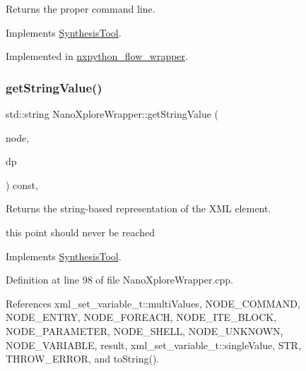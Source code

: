 Returns the proper command line. 



Implements \hyperlink{classSynthesisTool_a8eb2ef7a6230a997a2467d298613c045}{Synthesis\+Tool}.



Implemented in \hyperlink{classnxpython__flow__wrapper_ad88b053a2d5f727075d1e8dc2d574863}{nxpython\+\_\+flow\+\_\+wrapper}.

\mbox{\label{classNanoXploreWrapper_a88615cca1531c82e07e1ed0d4cc9a47e}} 
\subsubsection{\texorpdfstring{get\+String\+Value()}{getStringValue()}}
{\footnotesize\ttfamily std\+::string Nano\+Xplore\+Wrapper\+::get\+String\+Value (\begin{DoxyParamCaption}\item[{const \hyperlink{xml__script__command_8hpp_a1fe3d50ade66bc35e41be9b68bbbcd02}{xml\+\_\+script\+\_\+node\+\_\+t\+Ref}}]{node,  }\item[{const \hyperlink{DesignParameters_8hpp_ae36bb1c4c9150d0eeecfe1f96f42d157}{Design\+Parameters\+Ref} \&}]{dp }\end{DoxyParamCaption}) const\hspace{0.3cm}{\ttfamily [override]}, {\ttfamily [virtual]}}



Returns the string-\/based representation of the X\+ML element. 

this point should never be reached 

Implements \hyperlink{classSynthesisTool_a730699a51a36280c89b32f324dedc1a7}{Synthesis\+Tool}.



Definition at line 98 of file Nano\+Xplore\+Wrapper.\+cpp.



References xml\+\_\+set\+\_\+variable\+\_\+t\+::multi\+Values, N\+O\+D\+E\+\_\+\+C\+O\+M\+M\+A\+ND, N\+O\+D\+E\+\_\+\+E\+N\+T\+RY, N\+O\+D\+E\+\_\+\+F\+O\+R\+E\+A\+CH, N\+O\+D\+E\+\_\+\+I\+T\+E\+\_\+\+B\+L\+O\+CK, N\+O\+D\+E\+\_\+\+P\+A\+R\+A\+M\+E\+T\+ER, N\+O\+D\+E\+\_\+\+S\+H\+E\+LL, N\+O\+D\+E\+\_\+\+U\+N\+K\+N\+O\+WN, N\+O\+D\+E\+\_\+\+V\+A\+R\+I\+A\+B\+LE, result, xml\+\_\+set\+\_\+variable\+\_\+t\+::single\+Value, S\+TR, T\+H\+R\+O\+W\+\_\+\+E\+R\+R\+OR, and to\+String().



